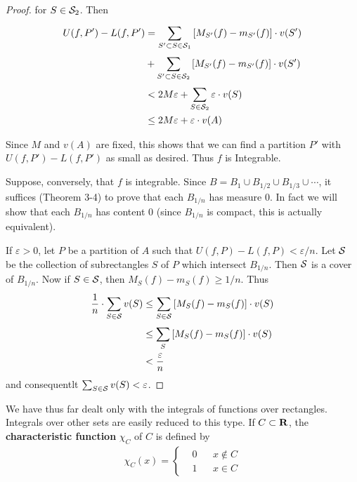\begin{proof}
    for $S\in \mathcal{S}_2$. Then 
    \begin{align*}
        U(f, P') - L(f, P')
        & = \sum_{S'\subset S\in \mathcal{S}_1}^{}{[M_{S'}(f) - m_{S'}(f)]\cdot v(S')} \\
        & + \sum_{S'\subset S\in \mathcal{S}_2}^{}{[M_{S'}(f) - m_{S'}(f)]\cdot v(S')} \\
        & < 2M\varepsilon + \sum_{S\in \mathcal{S}_2}^{}{\varepsilon\cdot v(S)}\\
        & \le 2M\varepsilon + \varepsilon\cdot v(A)\\
    \end{align*}

    Since $M$ and $v(A)$ are fixed, this shows that we can find a partition $P'$ with 
    $U(f, P') - L(f, P')$ as small as desired. Thus $f$ is Integrable.

    Suppose, conversely, that $f$ is integrable. Since $B =
    B_1 \cup B_{1/2} \cup B_{1/3} \cup \cdots$, it suffices (Theorem 3-4) to prove
    that each $B_{1/n}$ has measure 0. In fact we will show that each $B_{1/n}$ has 
    content 0 (since $B_{1/n}$ is compact, this is actually equivalent).

    If $\varepsilon>0$, let $P$ be a partition of $A$ such that $U(f, P) - L(f, P) < \varepsilon/n$.
    Let $\mathcal{S}$ be the collection of subrectangles $S$ of $P$ which intersect $B_{1/n}$.
    Then $\mathcal{S}$ is a cover of $B_{1/n}$. Now if $S\in \mathcal{S}$, then $M_S(f)-m_S(f)\ge 1/n$. Thus 
    \begin{align*}
        \frac{1}{n}\cdot \sum_{S\in \mathcal{S}}^{}{v(S)} 
        & \le \sum_{S\in\mathcal{S}}^{}{[M_S(f)-m_S(f)]\cdot v(S)} \\
        & \le \sum_{S}^{}{[M_S(f)-m_S(f)]\cdot v(S)} \\
        & < \frac{\varepsilon}{n}
    \end{align*}
    and consequentlt $\sum_{S\in \mathcal{S}}^{}{v(S)}<\varepsilon$.
\end{proof}

We have thus far dealt only with the integrals of functions
over rectangles. Integrals over other sets are easily reduced
to this type. If $C\subset \mathbf{R}$, the \textbf{characteristic function} $\chi_C$ of $C$ is defined by
\begin{align*}
    \chi_C(x) = 
    \left\{\begin{aligned}
        & 0 && x\notin C \\
        & 1 && x\in C
    \end{aligned}\right.
\end{align*}

